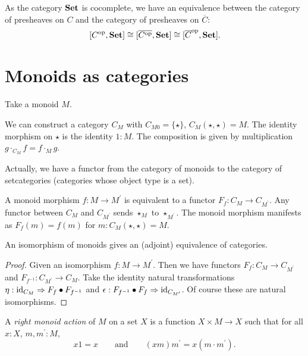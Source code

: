 \begin{corollary}\label{cor:karoubi-presheaf}
  As the category $ \mathbf{Set} $ is cocomplete, we have an equivalence between the category of presheaves on $ C $ and the category of presheaves on $ \overline C $:
  \[ [C^{\text{op}}, \mathbf{Set}] \cong [\overline{C^{\text{op}}}, \mathbf{Set}] \cong [\overline C^{\text{op}}, \mathbf{Set}]. \]
\end{corollary}

\section{Monoids as categories}\label{sec:monoid-category}
Take a monoid $ M $.
\begin{definition}
  We can construct a category $ C_M $ with $ C_{M0} = \{ \star \} $, $ C_M(\star, \star) = M $. The identity morphism on $ \star $ is the identity $ 1: M $. The composition is given by multiplication $ g \cdot_{C_M} f = f \cdot_M g $.
\end{definition}

\begin{remark}
  Actually, we have a functor from the category of monoids to the category of setcategories (categories whose object type is a set).

  A monoid morphism $ f: M \to M^\prime $ is equivalent to a functor $ F_f: C_M \to C_{M^\prime} $. Any functor between $ C_M $ and $ C_{M^\prime} $ sends $ \star_M $ to $ \star_{M^\prime} $. The monoid morphism manifests as $ F_f(m) = f(m) $ for $ m: C_M(\star, \star) = M $.
\end{remark}

\begin{lemma}
  An isomorphism of monoids gives an (adjoint) equivalence of categories.
\end{lemma}
\begin{proof}
  Given an isomorphism $ f: M \to M^\prime $. Then we have functors $ F_f: C_M \to C_{M^\prime} $ and $ F_{f^{-1}}: C_{M^\prime} \to C_M $. Take the identity natural transformations $ \eta: \text{id}_{C_M} \Rightarrow F_f \bullet F_{f^{-1}} $ and $ \epsilon: F_{f^{-1}} \bullet F_f \Rightarrow \text{id}_{C_{M^\prime}} $. Of course these are natural isomorphisms.
\end{proof}

\begin{definition}
  A \textit{right monoid action} of $ M $ on a set $ X $ is a function $ X \times M \to X $ such that for all $ x: X $, $ m, m^\prime: M $,
  \[ x 1 = x \qquad \text{and} \qquad (x m) m^\prime = x (m \cdot m^\prime). \]
\end{definition}

